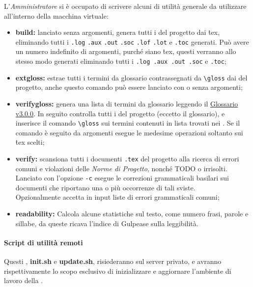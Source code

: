\documentclass{scalatekids-article}
\begin{document}
\label{sec:script}
L'\textit{Amministratore} si è occupato di scrivere alcuni  di utilità
generale da utilizzare all'interno della macchina virtuale:
\begin{itemize}
\item\textbf{build:} lanciato senza argomenti, genera tutti i  del
  progetto dai \.tex, eliminando tutti i  \verb=.log= \verb=.aux= \verb=.out= \verb=.soc=
  \verb=.lof= \verb=.lot= e \verb=.toc=
  generati. Può avere un numero indefinito di argomenti, purché siano
   \.tex,
  questi verranno allo stesso modo generati eliminando tutti i 
  \verb=.log .aux .out .soc= e \verb=.toc=;
\item\textbf{extgloss:} estrae tutti i termini da glossario contrassegnati da
  \verb=\gloss= dai  del progetto, anche questo comando può essere lanciato con
  o senza argomenti;
\item\textbf{verifygloss:} genera una lista di termini da glossario leggendo il
   \href{run:../RQ/Esterni/Glossario\_v3.0.0.pdf}{Glossario v3.0.0}. In seguito controlla tutti i  del
  progetto (eccetto il glossario), e inserisce il comando \verb=\gloss= sui termini
  contenuti in lista trovati nei . Se il comando è seguito da argomenti esegue le medesime
  operazioni soltanto sui  \.tex scelti;
\item\textbf{verify:} scansiona tutti i documenti \verb=.tex= del progetto alla
  ricerca di errori comuni e violazioni delle \textit{Norme di Progetto}, nonché
  TODO o  irrisolti. Lanciato con l'opzione \verb=-c=
  esegue le correzioni grammaticali basilari sui documenti che riportano una o
  più occorrenze di tali sviste.\\
  Opzionalmente accetta in input liste di errori grammaticali comuni;
\item\textbf{readability:} Calcola alcune statistiche sul testo, come numero
  frasi, parole e sillabe, da queste ricava l'indice di Gulpease sulla
  leggibilità.
\end{itemize}

\paragraph{Script di utilità remoti}

Questi , \textbf{init.sh} e \textbf{update.sh}, risiederanno sul server
privato, e avranno rispettivamente lo scopo esclusivo di inizializzare e
aggiornare l'ambiente di lavoro della .
\end{document}
